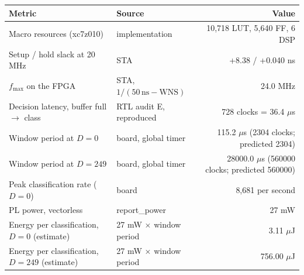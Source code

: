 \begin{tabular}{@{}llr@{}}
\toprule
Metric & Source & Value \\
\midrule
Macro resources (xc7z010) & implementation & 10,718 LUT, 5,640 FF, 6 DSP \\
Setup / hold slack at 20 MHz & STA & +8.38 / +0.040 ns \\
$f_\mathrm{max}$ on the FPGA & STA, $1/(50\,\mathrm{ns} - \mathrm{WNS})$ & 24.0 MHz \\
Decision latency, buffer full $\to$ class & RTL audit E, reproduced & 728 clocks = 36.4 $\mu$s \\
Window period at $D=0$ & board, global timer & 115.2 $\mu$s (2304 clocks; predicted 2304) \\
Window period at $D=249$ & board, global timer & 28000.0 $\mu$s (560000 clocks; predicted 560000) \\
Peak classification rate ($D=0$) & board & 8,681 per second \\
PL power, vectorless & report\_power & 27 mW \\
Energy per classification, $D=0$ (estimate) & 27 mW $\times$ window period & 3.11 $\mu$J \\
Energy per classification, $D=249$ (estimate) & 27 mW $\times$ window period & 756.00 $\mu$J \\
\bottomrule
\end{tabular}
